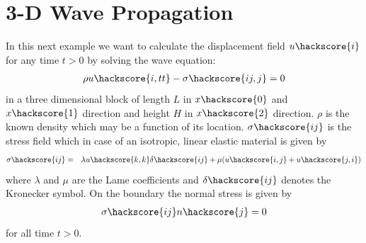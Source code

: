 
%
%
%


\section{3-D Wave Propagation}
\label{WAVE CHAP}

In this next example we want to calculate the displacement field $u\hackscore{i}$ for any time $t>0$ by solving the wave equation:
\begin{eqnarray}\label{WAVE general problem}
\rho u\hackscore{i,tt} - \sigma\hackscore{ij,j}=0
\end{eqnarray}
in a three dimensional block of length $L$ in $x\hackscore{0}$
and $x\hackscore{1}$ direction and height $H$
in $x\hackscore{2}$ direction. $\rho$ is the known density which may be a function of its location.
$\sigma\hackscore{ij}$ is the stress field  which in case of an isotropic, linear elastic material is given by
\begin{eqnarray} \label{WAVE stress}
\sigma\hackscore{ij} & = & \lambda u\hackscore{k,k} \delta\hackscore{ij} + \mu ( u\hackscore{i,j} + u\hackscore{j,i})
\end{eqnarray}
where $\lambda$ and $\mu$ are the Lame coefficients 
 and $\delta\hackscore{ij}$ denotes the Kronecker symbol.
On the boundary the normal stress is given by
\begin{eqnarray} \label{WAVE natural}
\sigma\hackscore{ij}n\hackscore{j}=0
\end{eqnarray}
for all time $t>0$.


